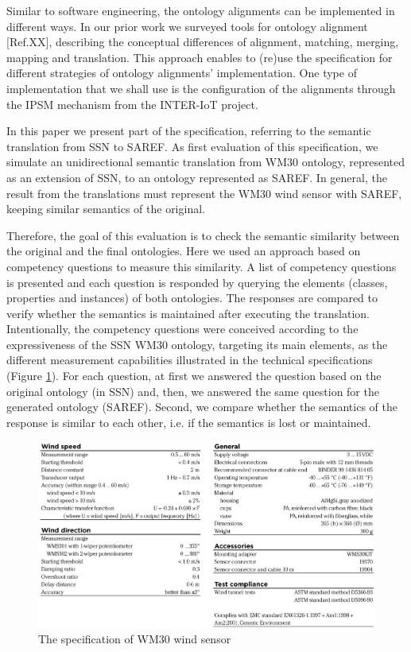 \documentclass{sig-alternate-05-2015}
\begin{document}
Similar to software engineering, the ontology alignments can be implemented in different ways. In our prior work we surveyed tools for ontology alignment [Ref.XX], describing the conceptual differences of alignment, matching, merging, mapping and translation. This approach enables to (re)use the specification for different strategies of ontology alignments’ implementation. One type of implementation that we shall use is the configuration of the alignments through the IPSM mechanism from the INTER-IoT project. 

In this paper we present part of the specification, referring to the semantic translation from SSN to SAREF. As first evaluation of this specification, we simulate an unidirectional semantic translation from WM30 ontology, represented as an extension of SSN, to an ontology represented as SAREF. In general, the result from the translations must represent the WM30 wind sensor with SAREF, keeping similar semantics of the original. 

Therefore, the goal of this evaluation is to check the semantic similarity between the original and the final ontologies. Here we used an approach based on competency questions to measure this similarity. A list of competency questions is presented and each question is responded by querying the elements (classes, properties and instances) of both ontologies. The responses are compared to verify whether the semantics is maintained after executing the translation. Intentionally, the competency questions were conceived according to the expressiveness of the SSN WM30 ontology, targeting its main elements, as the different measurement capabilities illustrated in the technical specifications (Figure \ref{fig:WM30specifications}). For each question, at first we answered the question based on the original ontology (in SSN) and, then, we answered the same question for the generated ontology (SAREF). Second, we compare whether the semantics of the response is similar to each other, i.e. if the semantics is lost or maintained. 

\begin{figure}[h!]
\centering
\includegraphics[scale=0.22]{WM30specifications}
\caption{The specification of WM30 wind sensor}
\label{fig:WM30specifications}
\end{figure}
\end{document}
